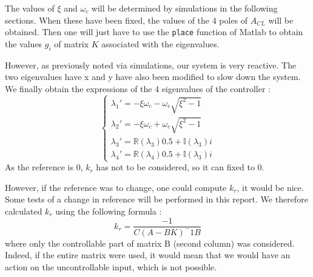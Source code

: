 The values of $\xi$ and $\omega_c$ will be determined by simulations in the following sections. When these have been fixed, the values of the 4 poles of $A_{CL}$ will be obtained. Then one will just have to use the \texttt{place} function of Matlab to obtain the values $g_i$ of matrix $K$ associated with the eigenvalues.\par
However, as previously noted via simulations, our system is very reactive. The two eigenvalues have x and y have also been modified to slow down the system. We finally obtain the expressions of the 4 eigenvalues of the controller :
$$
\begin{cases}
    \lambda_1' = -\xi\omega_c - \omega_c\sqrt{\xi^2 - 1}\\
    \lambda_2' = -\xi\omega_c + \omega_c\sqrt{\xi^2 - 1}\\
    \lambda_3' = \mathbb{R}(\lambda_3)0.5 + \mathbb{I}(\lambda_3)i\\
    \lambda_4' = \mathbb{R}(\lambda_4)0.5 + \mathbb{I}(\lambda_3)i
\end{cases}
$$
As the reference is 0, $k_r$ has not to be considered, so it can fixed to 0.\par
However, if the reference was to change, one could compute $k_r$, it would be nice. Some tests of a change in reference will be performed in this report. We therefore calculated $k_r$ using the following formula :
$$
k_r = \frac{-1}{C(A - BK)^-1 B}
$$
where only the controllable part of matrix B (second column) was considered. Indeed, if the entire matrix were used, it would mean that we would have an action on the uncontrollable input, which is not possible.

